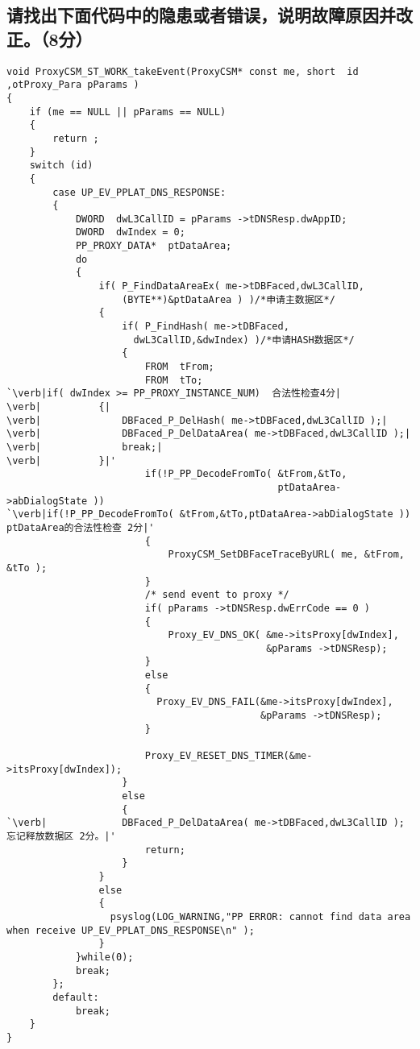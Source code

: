 ﻿\documentclass  [11pt,onecolumn,a4paper]{article}
\begin{document}
\subsection{请找出下面代码中的隐患或者错误，说明故障原因并改正。（8分）}
\begin{lstlisting}[escapeinside=`']
void ProxyCSM_ST_WORK_takeEvent(ProxyCSM* const me, short  id ,otProxy_Para pParams )
{
    if (me == NULL || pParams == NULL)
    {
        return ;
    }
    switch (id)
    {
        case UP_EV_PPLAT_DNS_RESPONSE:
        {
            DWORD  dwL3CallID = pParams ->tDNSResp.dwAppID; 
            DWORD  dwIndex = 0;
            PP_PROXY_DATA*  ptDataArea;   
            do
            {   
                if( P_FindDataAreaEx( me->tDBFaced,dwL3CallID,
                    (BYTE**)&ptDataArea ) )/*申请主数据区*/
                {
                    if( P_FindHash( me->tDBFaced,
                      dwL3CallID,&dwIndex) )/*申请HASH数据区*/
                    {
                        FROM  tFrom;
                        FROM  tTo;
`\verb|if( dwIndex >= PP_PROXY_INSTANCE_NUM)  合法性检查4分|
\verb|          {|
\verb|              DBFaced_P_DelHash( me->tDBFaced,dwL3CallID );|
\verb|              DBFaced_P_DelDataArea( me->tDBFaced,dwL3CallID );|
\verb|              break;|
\verb|          }|'
                        if(!P_PP_DecodeFromTo( &tFrom,&tTo,
                                               ptDataArea->abDialogState ))
`\verb|if(!P_PP_DecodeFromTo( &tFrom,&tTo,ptDataArea->abDialogState )) ptDataArea的合法性检查 2分|'
                        {
                            ProxyCSM_SetDBFaceTraceByURL( me, &tFrom, &tTo );
                        }                             
                        /* send event to proxy */ 
                        if( pParams ->tDNSResp.dwErrCode == 0 )
                        {
                            Proxy_EV_DNS_OK( &me->itsProxy[dwIndex],
                                             &pParams ->tDNSResp);
                        }
                        else
                        {
                          Proxy_EV_DNS_FAIL(&me->itsProxy[dwIndex],
                                            &pParams ->tDNSResp);
                        }

                        Proxy_EV_RESET_DNS_TIMER(&me->itsProxy[dwIndex]);
                    }
                    else
                    {
`\verb|             DBFaced_P_DelDataArea( me->tDBFaced,dwL3CallID );  忘记释放数据区 2分。|'
                        return;
                    }
                }
                else
                {
                  psyslog(LOG_WARNING,"PP ERROR: cannot find data area when receive UP_EV_PPLAT_DNS_RESPONSE\n" );
                }
            }while(0);                 
            break;
        };
        default:
            break;
    }
}
\end{lstlisting}
\end{document}
